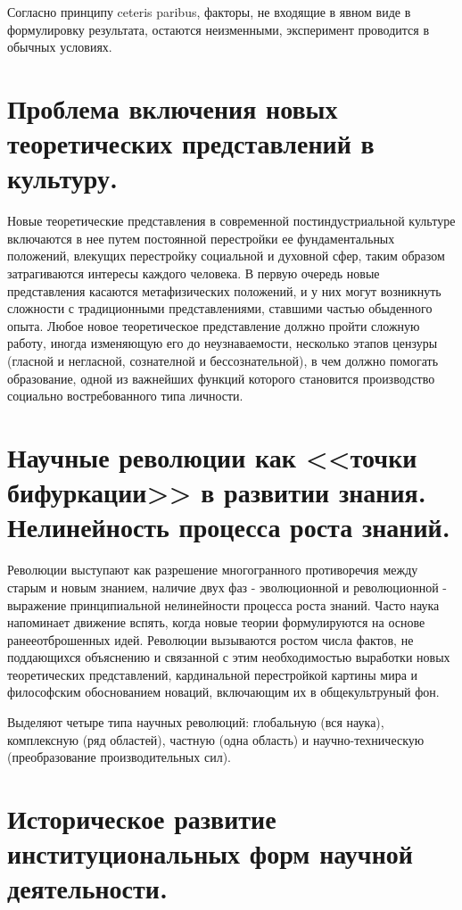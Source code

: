\documentclass[12pt, specialist, subf, substylefile = spbu.rtx]{disser}
\begin{document}
Согласно принципу ceteris paribus, факторы, не входящие в явном виде в формулировку результата, остаются неизменными, эксперимент проводится в обычных условиях.

\section{Проблема включения новых теоретических представлений в культуру.}
Новые теоретические представления в современной постиндустриальной культуре включаются в нее путем постоянной перестройки ее фундаментальных положений, влекущих перестройку социальной и духовной сфер, таким образом затрагиваются интересы каждого человека. В первую очередь новые представления касаются метафизических положений, и у них могут возникнуть сложности с традиционными представлениями, ставшими частью обыденного опыта. Любое новое теоретическое представление должно пройти сложную работу, иногда изменяющую его до неузнаваемости, несколько этапов цензуры (гласной и негласной, сознателной и бессознательной), в чем должно помогать образование, одной из важнейших функций которого становится производство социально востребованного типа личности.

\section{Научные революции как <<точки бифуркации>> в развитии знания. Нелинейность процесса роста знаний.}
Революции выступают как разрешение многогранного противоречия между старым и новым знанием, наличие двух фаз - эволюционной и революционной - выражение принципиальной нелинейности процесса роста знаний. Часто наука напоминает движение вспять, когда новые теории формулируются на основе ранееотброшенных идей. Революции вызываются ростом числа фактов, не поддающихся объяснению и связанной с этим необходимостью выработки новых теоретических представлений, кардинальной перестройкой картины мира и философским обоснованием новаций, включающим их в общекультруный фон.

Выделяют четыре типа научных революций: глобальную (вся наука), комплексную (ряд областей), частную (одна область) и научно-техническую (преобразование производительных сил).

\section{Историческое развитие институциональных форм научной деятельности.}
\end{document}

